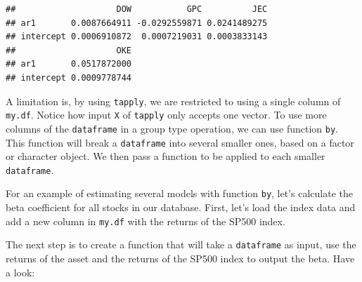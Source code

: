 \documentclass[11pt,]{book}
\newenvironment{Shaded}{\begin{snugshade}}{\end{snugshade}}
\newcommand{\KeywordTok}[1]{\textcolor[rgb]{0.27,0.27,0.27}{\textbf{#1}}}
\newcommand{\DataTypeTok}[1]{\textcolor[rgb]{0.27,0.27,0.27}{#1}}
\newcommand{\StringTok}[1]{\textcolor[rgb]{0.5,0.5,0.5}{#1}}
\newcommand{\CommentTok}[1]{\textcolor[rgb]{0.56,0.35,0.01}{\textit{#1}}}
\newcommand{\OperatorTok}[1]{\textcolor[rgb]{0.81,0.36,0.00}{\textbf{#1}}}
\newcommand{\NormalTok}[1]{#1}
\begin{document}
\begin{verbatim}
##                    DOW           GPC          JEC
## ar1       0.0087664911 -0.0292559871 0.0241489275
## intercept 0.0006910872  0.0007219031 0.0003833143
##                    OKE
## ar1       0.0517872000
## intercept 0.0009778744
\end{verbatim}

A limitation is, by using \texttt{tapply}, we are restricted to using a
single column of \texttt{my.df}. Notice how input \texttt{X} of
\texttt{tapply} only accepts one vector. To use more columns of the
\texttt{dataframe} in a group type operation, we can use function
\texttt{by}. This function will break a \texttt{dataframe} into several
smaller ones, based on a factor or character object. We then pass a
function to be applied to each smaller \texttt{dataframe}.

For an example of estimating several models with function \texttt{by},
let's calculate the beta coefficient for all stocks in our database.
First, let's load the index data and add a new column in \texttt{my.df}
with the returns of the SP500 index.

\begin{Shaded}
\end{Shaded}

The next step is to create a function that will take a
\texttt{dataframe} as input, use the returns of the asset and the
returns of the SP500 index to output the beta. Have a look:
\end{document}

